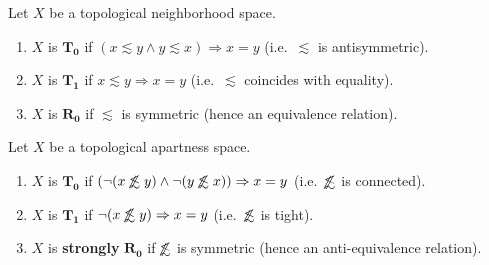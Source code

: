\documentclass{article}
\def\apart{\mathrel{\#}}
\def\oapt{\mathrel{\!\not\,\not\lesssim}}
\def\leapx{\lesssim}
\let\implies\Rightarrow
\begin{document}
\begin{defn}
  Let $X$ be a topological neighborhood space.
  \begin{enumerate}
  \item $X$ is $\mathbf{T_0}$ if $(x\leapx y \land y\leapx x) \implies x=y$ (i.e.\ $\leapx$ is antisymmetric).
  \item $X$ is $\mathbf{T_1}$ if $x\leapx y \implies x=y$ (i.e.\ $\leapx$ coincides with equality).
  \item $X$ is $\mathbf{R_0}$ if $\leapx$ is symmetric (hence an equivalence relation).
  \end{enumerate}
  Let $X$ be a topological apartness space.
  \begin{enumerate}
  \item $X$ is $\mathbf{T_0}$ if $(\neg(x\oapt y) \land \neg(y\oapt x)) \implies x=y$ (i.e.\ $\oapt$ is connected).
  \item $X$ is $\mathbf{T_1}$ if $\neg(x\oapt y)\implies x=y$ (i.e.\ $\oapt$ is tight).
  \item $X$ is \textbf{strongly} $\mathbf{R_0}$ if $\oapt$ is symmetric (hence an anti-equivalence relation).
  \end{enumerate}
\end{defn}
\end{document}
